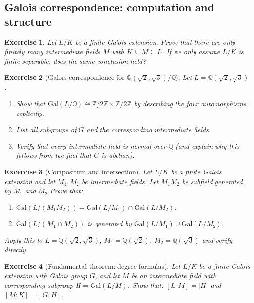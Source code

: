 \documentclass{article}
\newtheorem{exer}{Excercise}
\newcommand{\Z}{\mathbb{Z}}
\newcommand{\Q}{\mathbb{Q}}
\begin{document}
\subsection*{Galois correspondence: computation and structure}

\begin{exer}
Let $L/K$ be a finite Galois extension. Prove that there are only finitely many intermediate fields $M$ with $K\subseteq M \subseteq L$. If we only assume $L/K$ is finite separable, does the same conclusion hold?
\end{exer}


\begin{exer}[Galois correspondence for $\Q(\sqrt{2},\sqrt{3})/\Q$]
Let $L=\Q(\sqrt{2},\sqrt{3})$.
\begin{enumerate}
  \item Show that $\mathrm{Gal}(L/\Q)\cong \Z/2\Z\times \Z/2\Z$ by describing the four automorphisms explicitly.
  \item List all subgroups of $G$ and the corresponding intermediate fields.
  \item Verify that every intermediate field is normal over $\Q$ (and explain why this follows from the fact that $G$ is abelian).
\end{enumerate}
\end{exer}


\begin{exer}[Compositum and intersection]
Let $L/K$ be a finite Galois extension and let $M_1, M_2$ be intermediate fields. Let $M_1M_2$ be subfield generated by $M_1$ and $M_2$.Prove that:
\begin{enumerate}
  \item $\mathrm{Gal}(L/(M_1 M_2)) = \mathrm{Gal}(L/M_1) \cap \mathrm{Gal}(L/M_2)$.
  \item $\mathrm{Gal}(L/(M_1\cap M_2))$ is generated by $\mathrm{Gal}(L/M_1)\cup \mathrm{Gal}(L/M_2)$.
\end{enumerate}
Apply this to $L=\Q(\sqrt{2},\sqrt{3})$, $M_1=\Q(\sqrt{2})$, $M_2=\Q(\sqrt{3})$ and verify directly.
\end{exer}


\begin{exer}[Fundamental theorem: degree formulas]
Let $L/K$ be a finite Galois extension with Galois group $G$, and let $M$ be an intermediate field with corresponding subgroup $H=\mathrm{Gal}(L/M)$. Show that: $[L:M]=|H|$ and $[M:K]=[G:H]$.
\end{exer}
\end{document}
